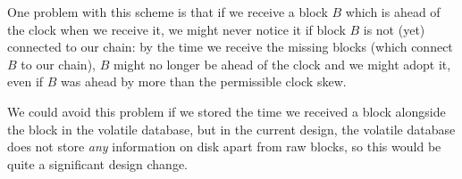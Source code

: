 \begin{bug}
One problem with this scheme is that if we receive a block $B$ which is ahead of
the clock when we receive it, we might never notice it if block $B$ is not (yet)
connected to our chain: by the time we receive the missing blocks (which connect
$B$ to our chain), $B$ might no longer be ahead of the clock and we might adopt
it, even if $B$ was ahead by more than the permissible clock skew.

We could avoid this problem if we stored the time we received a block alongside
the block in the volatile database, but in the current design, the volatile
database does not store \emph{any} information on disk apart from raw blocks,
so this would be quite a significant design change.
\end{bug}
